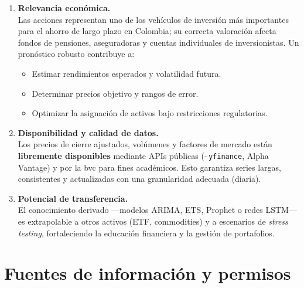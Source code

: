 \documentclass[
  11pt,
]{book}
\providecommand{\tightlist}{%
  \setlength{\itemsep}{0pt}\setlength{\parskip}{0pt}}
\begin{document}
\begin{enumerate}
\def\labelenumi{\arabic{enumi}.}
\item
  \textbf{Relevancia económica.}\\
  Las acciones representan uno de los vehículos de inversión más importantes para el ahorro de largo plazo en Colombia; su correcta valoración afecta fondos de pensiones, aseguradoras y cuentas individuales de inversionistas. Un pronóstico robusto contribuye a:

  \begin{itemize}
  \tightlist
  \item
    Estimar rendimientos esperados y volatilidad futura.\\
  \item
    Determinar precios objetivo y rangos de error.\\
  \item
    Optimizar la asignación de activos bajo restricciones regulatorias.
  \end{itemize}
\item
  \textbf{Disponibilidad y calidad de datos.}\\
  Los precios de cierre ajustados, volúmenes y factores de mercado están \textbf{libremente disponibles} mediante APIs públicas (‐\,\texttt{yfinance}, Alpha\,Vantage) y por la bvc para fines académicos. Esto garantiza series largas, consistentes y actualizadas con una granularidad adecuada (diaria).
\item
  \textbf{Potencial de transferencia.}\\
  El conocimiento derivado ---modelos ARIMA, ETS, Prophet o redes LSTM--- es extrapolable a otros activos (ETF, commodities) y a escenarios de \emph{stress testing}, fortaleciendo la educación financiera y la gestión de portafolios.
\end{enumerate}

\chapter{Fuentes de información y permisos}\label{fuentes-de-informaciuxf3n-y-permisos}
\end{document}
